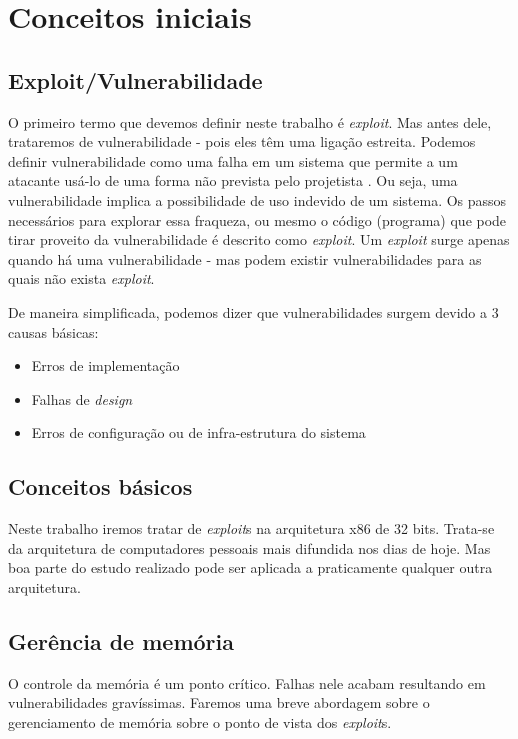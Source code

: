 
\chapter{Conceitos iniciais}
\label{chap:conceitos_iniciais}

	\section{Exploit/Vulnerabilidade}
	O primeiro termo que devemos definir neste trabalho é \textsl{exploit}. Mas antes dele,
	trataremos de vulnerabilidade - pois eles têm uma ligação estreita.
	Podemos definir vulnerabilidade como uma falha em um sistema que permite
	a um atacante usá-lo de uma forma não prevista pelo projetista \cite{Anley2007}.
	Ou seja, uma vulnerabilidade implica a possibilidade de uso indevido de um sistema.
	Os passos necessários para explorar essa fraqueza, ou mesmo o código (programa) que pode tirar
	proveito da vulnerabilidade é descrito como \textsl{exploit}.
	Um \textsl{exploit} surge apenas quando há uma vulnerabilidade - mas podem existir
	vulnerabilidades para as quais não exista \textsl{exploit}.

	De maneira simplificada, podemos dizer que vulnerabilidades surgem devido a 3 causas básicas:
	\begin{itemize}
		\item{Erros de implementação}
		\item{Falhas de \textsl{design}}
		\item{Erros de configuração ou de infra-estrutura do sistema}
	\end{itemize}


	\section{Conceitos básicos}
	Neste trabalho iremos tratar de \textsl{exploit}s na arquitetura x86 de 32 bits. Trata-se da arquitetura de computadores
	pessoais mais difundida nos dias de hoje. Mas boa parte do estudo realizado pode ser aplicada
	a praticamente qualquer outra arquitetura.

	\section{Gerência de memória}
	O controle da memória é um ponto crítico. Falhas nele acabam resultando em vulnerabilidades 
	gravíssimas. Faremos uma breve abordagem sobre o gerenciamento de memória sobre
	o ponto de vista dos \textsl{exploit}s.

